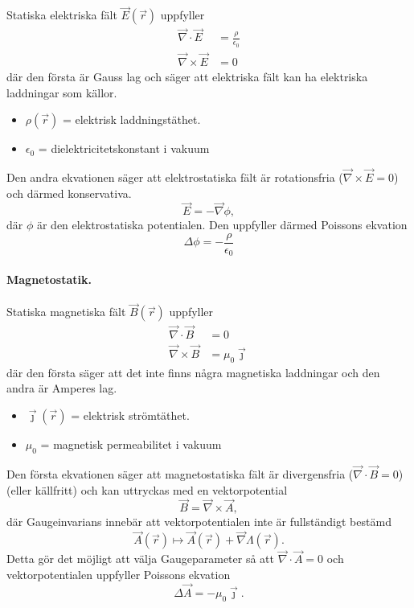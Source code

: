 \documentclass[%
oneside,                 %
final,                   %
10pt]{article}
\begin{document}
\vspace{3mm}


Statiska elektriska fält $\vec{E}(\vec{r})$ uppfyller
\begin{align}
  \vec{\nabla} \cdot \vec{E} &= \frac{\rho}{\epsilon_0} \\
  \vec{\nabla} \times \vec{E} &= 0
\end{align}
där den första är Gauss lag och säger att elektriska fält kan ha elektriska
laddningar som källor.
\begin{itemize}
\item $\rho(\vec{r})$ = elektrisk laddningstäthet.

\item $\epsilon_0$ = dielektricitetskonstant i vakuum
\end{itemize}

\noindent
Den andra ekvationen säger att elektrostatiska fält är rotationsfria ($\vec{\nabla} \times \vec{E} = 0$) och därmed konservativa. 
$$
\vec{E} = -\vec{\nabla} \phi,
$$
där $\phi$ är den elektrostatiska potentialen. Den uppfyller därmed Poissons ekvation
$$
\Delta \phi = - \frac{\rho}{\epsilon_0}
$$

\paragraph{Magnetostatik.}


\vspace{3mm}


Statiska magnetiska fält $\vec{B}(\vec{r})$ uppfyller
\begin{align}
  \vec{\nabla} \cdot \vec{B} &= 0 \\
  \vec{\nabla} \times \vec{B} &= \mu_0 \vec{\jmath}
\end{align}
där den första säger att det inte finns några magnetiska laddningar och den andra är Amperes lag.
\begin{itemize}
\item $\vec{\jmath}(\vec{r})$ = elektrisk strömtäthet.

\item $\mu_0$ = magnetisk permeabilitet i vakuum
\end{itemize}

\noindent
Den första ekvationen säger att magnetostatiska fält är divergensfria ($\vec{\nabla} \cdot \vec{B} = 0$) (eller källfritt) och kan uttryckas med en vektorpotential
$$
\vec{B} = \vec{\nabla} \times \vec{A},
$$
där Gaugeinvarians innebär att vektorpotentialen inte är fullständigt
bestämd
$$
\vec{A}(\vec{r}) \mapsto \vec{A}(\vec{r}) + \vec{\nabla} \Lambda(\vec{r}).
$$
Detta gör det möjligt att välja Gaugeparameter så att $\vec{\nabla} \cdot \vec{A} = 0$ och vektorpotentialen uppfyller Poissons ekvation
$$
\Delta \vec{A} = -\mu_0 \vec{\jmath}.
$$
\end{document}
